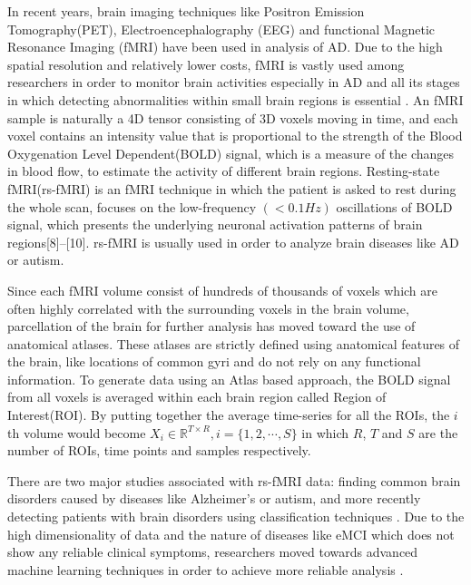\documentclass[journal]{IEEEtran}
\begin{document}
	
	In recent years, brain imaging techniques like Positron Emission Tomography(PET)\cite{r21}, Electroencephalography (EEG)\cite{r22}
	 and functional Magnetic Resonance Imaging (fMRI)\cite{r23} 
	 have been used in analysis of AD. Due to the high spatial resolution and relatively lower costs, fMRI is vastly used among researchers in order to monitor brain activities especially in AD and all its stages in which detecting abnormalities within small brain regions is essential \cite{r04}. 
	An fMRI sample is naturally a 4D tensor consisting of 3D voxels moving in time, and each voxel contains an intensity value that is proportional to the strength of the Blood Oxygenation Level Dependent(BOLD) signal, which is a measure of the changes in blood flow, to estimate the activity of different brain regions\cite{r07}.
	Resting-state fMRI(rs-fMRI) is an fMRI technique in which the patient is asked to rest during the whole scan, focuses on the low-frequency $\left( < 0.1 Hz \right)$  oscillations of BOLD signal, which presents the underlying neuronal activation patterns of brain regions[8]–[10]. rs-fMRI is usually used in order to analyze brain diseases like AD or autism\cite{r33,r34}.
	
	Since each fMRI volume consist of hundreds of thousands of voxels which are often highly correlated with the surrounding voxels in the brain volume, parcellation of the brain for further analysis has moved toward the use
	of anatomical atlases. These atlases are strictly defined using
	anatomical features of the brain, like locations of common gyri
	and do not rely on any functional information.
	To generate data
	using an Atlas based approach, the BOLD signal from all voxels is averaged within each brain region called Region of Interest(ROI)\cite{r09}.
	By putting together the average time-series for all the ROIs, the $i$th volume would become $X_i \in \mathbb{R}^{T \times R} , i = \{1,2,\cdots, S\}$ in which $R$, $T$ and $S$ are the number of ROIs, time points and samples respectively. %
	
	There are two major studies associated with rs-fMRI data: finding common brain disorders caused by diseases like Alzheimer's or autism, and more recently detecting patients with brain disorders using classification techniques \cite{r35,r36}. Due to the high dimensionality of data and the nature of diseases like eMCI which does not show any reliable clinical symptoms,
	researchers moved towards advanced machine learning techniques in order to achieve more reliable analysis \cite{r37}.
	
\end{document}
